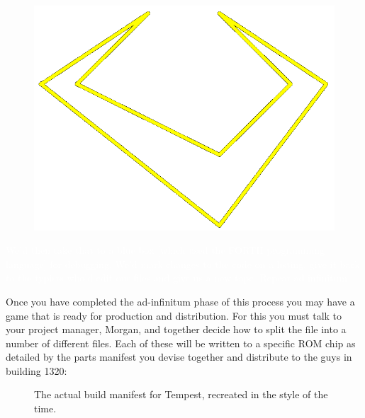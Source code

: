 \begin{definition}
\setlength{\intextsep}{0pt}%
\setlength{\columnsep}{3pt}%
\begin{figure}
\includegraphics[width=\linewidth]{src/callout/claw_t.png} 
\end{figure}
\small
\textcolor{white}{
We’d then take that to a blue box [which used the
FORTH programming language] for debugging. We’d mark changes to the code on a
listing, give it back to the typists who’d edit our files and give us a new
tape. Repeat ad infinitum.
}
\end{definition}

Once you have completed the ad-infinitum phase of this process you may have a game that is ready
for production and distribution. For this you must talk to your project manager, Morgan, and together
decide how to split the  file into a number of different files. Each of these will
be written to a specific ROM chip as detailed by the parts manifest you devise together and distribute to
the guys in building 1320:
\begin{figure}[H]
			\centering
		\caption{The actual build manifest for Tempest, recreated in the style of the time.}
\end{figure}


